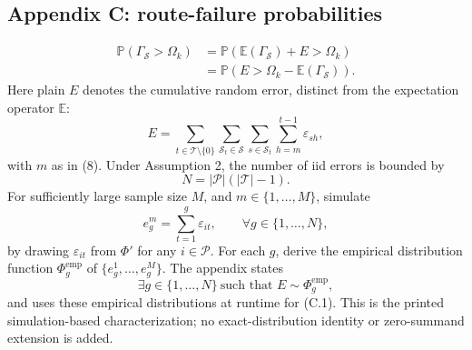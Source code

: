 \documentclass[10pt]{article}
\begin{document}
\subsection*{Appendix C: route-failure probabilities}
\begin{equation}
\begin{aligned}
\mathbb P(\Gamma_{\mathcal S}>\Omega_k)
&=\mathbb P(\mathbb E(\Gamma_{\mathcal S})+E>\Omega_k)\\
&=\mathbb P(E>\Omega_k-\mathbb E(\Gamma_{\mathcal S})).
\end{aligned}\tag{C.1}
\end{equation}
Here plain $E$ denotes the cumulative random error, distinct from the expectation operator $\mathbb E$:
\begin{equation}
 E=\sum_{t\in\mathcal T\setminus\{0\}}\sum_{\mathcal S_t\in\mathcal S}\sum_{s\in\mathcal S_t}\sum_{h=m}^{t-1}\varepsilon_{sh},
\tag{C.2}
\end{equation}
with $m$ as in (8). Under Assumption 2, the number of iid errors is bounded by
\[
 N=|\mathcal P|(|\mathcal T|-1).
\]
For sufficiently large sample size $M$, and $m\in\{1,\ldots,M\}$, simulate
\begin{equation}
 e^m_g=\sum_{t=1}^{g}\varepsilon_{it},\qquad\forall g\in\{1,\ldots,N\},
\tag{C.3}
\end{equation}
by drawing $\varepsilon_{it}$ from $\Phi'$ for any $i\in\mathcal P$. For each $g$, derive the empirical distribution function $\Phi^{\mathrm{emp}}_g$ of $\{e^1_g,\ldots,e^M_g\}$. The appendix states
\[
\exists g\in\{1,\ldots,N\}\ \text{such that }E\sim\Phi^{\mathrm{emp}}_g,
\]
and uses these empirical distributions at runtime for (C.1). This is the printed simulation-based characterization; no exact-distribution identity or zero-summand extension is added.
\end{document}
